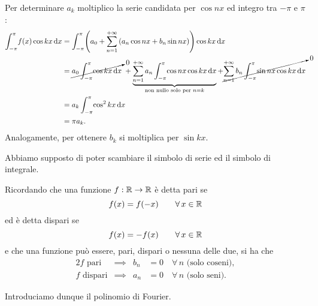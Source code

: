 \documentclass[../../analisi2]{subfiles}
\begin{document}
\begin{teorema}
            Per determinare \(a_k\) moltiplico la serie candidata per \(\cos nx\) ed integro tra \(-\pi\) e \(\pi\):
            \begin{align*}
                \int_{-\pi}^{\pi} \! f(x) \cos kx \, \mathrm{d}x &= \int_{-\pi}^{\pi} \! \left(a_0 + \sum_{n = 1}^{+\infty} \left(a_n \cos nx + b_n \sin nx\right)\right) \cos kx \, \mathrm{d}x\\
                &= \cancelto{0}{a_0 \int_{-\pi}^{\pi} \! \cos kx \, \mathrm{d}x} \; + \underbrace{\sum_{n = 1}^{+\infty} a_n \int_{-\pi}^{\pi} \! \cos nx \cos kx \, \mathrm{d}x}_{\text{non nullo solo per } n = k} + \cancelto{0}{\sum_{n = 1}^{+\infty} b_n \int_{-\pi}^{\pi} \! \sin nx \cos kx \, \mathrm{d}x}\\
                &= a_k \int_{-\pi}^{\pi} \! \cos^2 kx \, \mathrm{d}x\\
                &= \pi a_k.
            \end{align*}
            Analogamente, per ottenere \(b_k\) si moltiplica per \(\sin kx\).
        \end{teorema}
        \begin{osservazione}
            Abbiamo supposto di poter scambiare il simbolo di serie ed il simbolo di integrale.
        \end{osservazione}
        \begin{osservazione}
            Ricordando che una funzione \(f : \mathbb{R} \to \mathbb{R}\) è detta pari se
            \[
                f(x) = f(-x) \qquad \forall \, x \in \mathbb{R}
            \]
            ed è detta dispari se
            \[
                f(x) = -f(x) \qquad \forall \, x \in \mathbb{R}
            \]
            e che una funzione può essere, pari, dispari o nessuna delle due, si ha che
            \begin{alignat*}{2}
                f \text{ pari} &\implies& b_n &= 0 \quad \forall \, n \text{ (solo coseni)},\\
                f \text{ dispari} &\implies& a_n &= 0 \quad \forall \, n \text{ (solo seni)}.
            \end{alignat*}
        \end{osservazione}

        Introduciamo dunque il polinomio di Fourier.
\end{document}
